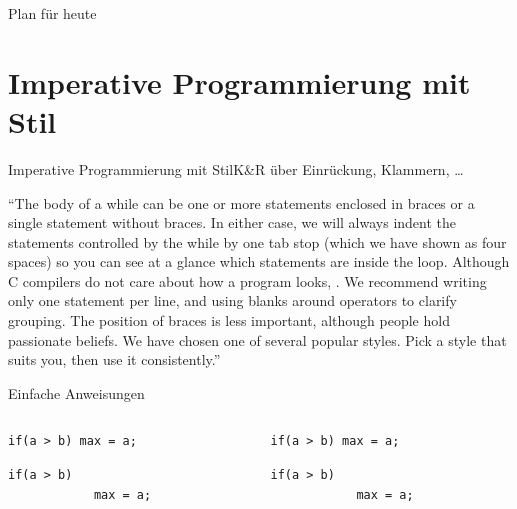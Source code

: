 \documentclass[10pt]{beamer} %
\date{}
\begin{document}
\maketitle

\begin{frame}{Plan für heute}

	\tableofcontents

\end{frame}

\section{Imperative Programmierung mit Stil}

\begin{frame}{Imperative Programmierung mit Stil}{K\&R über Einrückung, Klammern, \ldots}
	
	\enquote{The body of a while can be one or more statements enclosed in braces or a single statement without braces.	
		In either case, we will always indent the statements controlled by the while by one tab stop
		(which we have shown as four spaces) so you can see at a glance which statements are inside
		the loop.  Although C
		compilers do not care about how a program looks, . We recommend writing only one statement per
		line, and using blanks around operators to clarify grouping. The position of braces is less
		important, although people hold passionate beliefs. We have chosen one of several popular
		styles. Pick a style that suits you, then use it consistently.}
	
\end{frame}

\begin{frame}[fragile]{Einfache Anweisungen}

	\begin{columns}
	\begin{column}{.4\textwidth}
	
	\begin{lstlisting}[gobble=4]
		if(a > b) max = a;
	\end{lstlisting}
	
	\begin{lstlisting}[gobble=4]
		if(a > b) 
			max = a;
	\end{lstlisting}
	
	\end{column}
	\begin{column}{.4\textwidth}
	
	\begin{lstlisting}[gobble=4,showspaces,showtabs]
		if(a > b) max = a;
	\end{lstlisting}
	
	\begin{lstlisting}[gobble=4,showspaces,showtabs]
		if(a > b) 
			max = a;
	\end{lstlisting}
	
	\end{column}
	\end{columns}
	
\end{frame}
\end{document}
